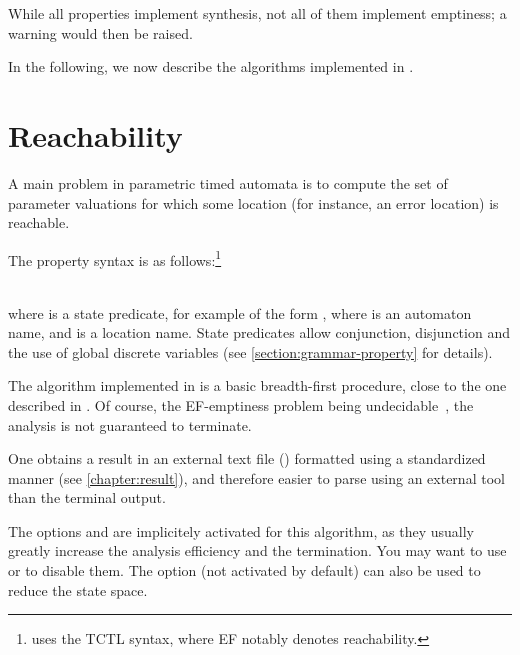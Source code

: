While all properties implement synthesis, not all of them implement emptiness; a warning would then be raised.

In the following, we now describe the algorithms implemented in \imitator{}.

\section{Reachability}\label{ss:mode:EFsynth}

A main problem in parametric timed automata is to compute the set of parameter valuations for which some location (for instance, an error location) is reachable.

The property syntax is as follows:\footnote{%
	\imitator{} uses the TCTL syntax, where EF notably denotes reachability.
}

\\
where  is a state predicate, for example of the form , where  is an automaton name, and  is a location name.
State predicates allow conjunction, disjunction and the use of global discrete variables (see \cref{section:grammar-property} for details).

The algorithm \EFsynth{} implemented in \imitator{} is a basic breadth-first procedure, close to the one described in \cite{JLR15}.
Of course, the EF-emptiness problem being undecidable~\cite{AHV93}, the analysis is not guaranteed to terminate.

%

One obtains a result in an external text file () formatted using a standardized manner (see \cref{chapter:result}), and therefore easier to parse using an external tool than the terminal output.

The options  and  are implicitely activated for this algorithm, as they usually greatly increase the analysis efficiency and the termination.
You may want to use  or  to disable them.
The option  (not activated by default) can also be used to reduce the state space.

